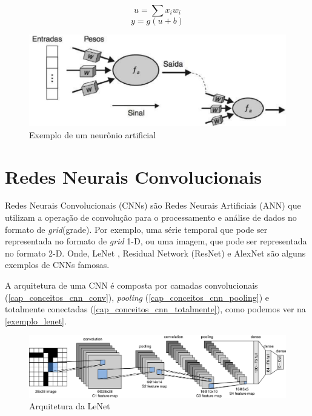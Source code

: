 \begin{equation}\label{eq_neuronio}
u = \sum x_i w_i
\end{equation}
\begin{equation}\label{eq_ativacao}
y = g(u + b)
\end{equation}

\begin{figure}[htb]
	\caption {\label{cap_conceitos_ex_neuronio} Exemplo de um neurônio artificial}
	\begin{center}
		\includegraphics[scale=0.3]{Imagens/exemplo_neuronio_artificial}
	\end{center}
\end{figure}

\section{Redes Neurais Convolucionais}\label{cap_conceitos_cnn}
Redes Neurais Convolucionais (CNNs) são Redes Neurais Artificiais (ANN)
que utilizam a operação de convolução para o processamento e análise de dados no formato de \textit{grid}(grade).
Por exemplo, uma série temporal que pode ser representada no formato de \textit{grid} 1-D,
ou uma imagem, que pode ser representada no formato 2-D. \cite{Goodfellow-et-al-2016}
Onde, LeNet \cite{lenet}, Residual Network (ResNet) \cite{resnet} e AlexNet \cite{alexnet} são alguns exemplos de CNNs
famosas.

A arquitetura de uma CNN é composta por camadas convolucionais (\ref{cap_conceitos_cnn_conv}),
\textit{pooling} (\ref{cap_conceitos_cnn_pooling}) e totalmente conectadas (\ref{cap_conceitos_cnn_totalmente}),
como podemos ver na \autoref{exemplo_lenet}.

\begin{figure}[htb]
	\caption {\label{exemplo_lenet} Arquitetura da LeNet}
	\begin{center}
		\includegraphics[scale=0.5]{Imagens/lenet}
	\end{center}
\end{figure}

